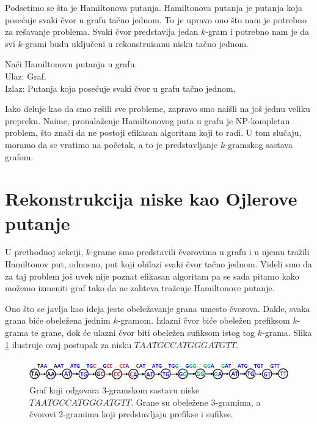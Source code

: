 Podsetimo se šta je Hamiltonova putanja. Hamiltonova putanja je putanja koja posećuje svaki čvor u grafu tačno jednom. To je upravo ono što nam je potrebno za rešavanje problema. Svaki čvor predstavlja jedan $k$-gram i potrebno nam je da svi $k$-grami budu uključeni u rekonstruisanu nisku tačno jednom.

\begin{problem}
	Naći Hamiltonovu putanju u grafu. \\
	Ulaz: Graf. \\
	Izlaz: Putanja koja posećuje svaki čvor u grafu tačno jednom.
\end{problem}

Iako deluje kao da smo rešili sve probleme, zapravo smo naišli na još jednu veliku prepreku. Naime, pronalaženje Hamiltonovog puta u grafu je NP-kompletan problem, što znači da ne postoji efikasan algoritam koji to radi. U tom slučaju, moramo da se vratimo na početak, a to je predstavljanje $k$-gramskog sastava grafom.

\section{Rekonstrukcija niske kao Ojlerove putanje}

U prethodnoj sekciji, $k$-grame smo predstavili čvorovima u grafu i u njemu tražili Hamiltonov put, odnosno, put koji obilazi svaki čvor tačno jednom. Videli smo da za taj problem još uvek nije poznat efikasan algoritam pa se sada pitamo kako možemo izmeniti graf tako da ne zahteva traženje Hamiltonove putanje.

Ono što se javlja kao ideja jeste obeležavanje grana umesto čvorova. Dakle, svaka grana biće obeležena jednim $k$-gramom. Izlazni čvor biće obeležen prefiksom $k$-grama te grane, dok će ulazni čvor biti obeležen sufiksom istog tog $k$-grama. Slika \ref{slika:ojler} ilustruje ovaj postupak za nisku $TAATGCCATGGGATGTT$.

\begin{figure}[h]
	\centering
	\includegraphics[width=1\textwidth]{poglavlja/3/slike/ojler.png}
	\caption{Graf koji odgovara 3-gramskom sastavu niske $TAATGCCATGGGATGTT$. Grane su obeležene 3-gramima, a čvorovi 2-gramima koji predstavljaju prefikse i sufikse.}
	\label{slika:ojler}
\end{figure} 

